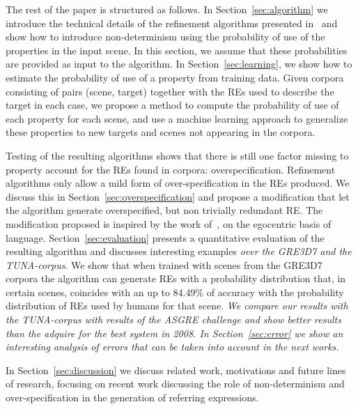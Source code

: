The rest of the paper is structured as follows. In Section~\ref{sec:algorithm} we introduce the technical details of the 
refinement algorithms presented in~\cite{arec2:2008:Areces,arec:usin11} and show how to introduce non-determinism using 
the probability of use of the properties in the input scene. In this section, we assume that these probabilities are provided as 
input to the algorithm. In Section~\ref{sec:learning}, we show how to estimate the 
probability of use of a property from training data. Given corpora consisting of pairs (scene, target) together with the REs used to 
describe the target in each case, we propose a method to compute the probability of use of each property for each scene, and use a machine learning approach to generalize these properties to new targets and scenes not appearing in the corpora. 

Testing of the resulting algorithms shows that there is still one factor missing to property account for the REs found in corpora: overspecification.  Refinement algorithms only allow a mild form of over-specification in the REs produced.  We discuss this in 
Section~\ref{sec:overspecification} and propose a modification that let the algorithm generate overspecified, but non trivially redundant RE.  The modification proposed is inspired by the work of~, on the egocentric basis of language.  
Section~\ref{sec:evaluation} presents a quantitative evaluation of the resulting algorithm and discusses interesting examples \textit{over the GRE3D7 and the TUNA-corpus}. 
We show that when trained with scenes from the GRE3D7 corpora the algorithm can generate REs with a probability distribution that, 
in certain scenes, coincides with an up to 84.49\% of accuracy with the probability distribution of REs used by humans for that scene. 
\textit{We compare our results with the TUNA-corpus with results of the ASGRE challenge and show better results than the adquire for the best system in 2008.
In Section~\ref{sec:error} we show an interesting analysis of errors that can be taken into account in the next works.}

In Section~\ref{sec:discussion} we discuss related work, motivations and future lines of research, focusing on recent work discussing the role 
of non-determinism and over-specification in the generation of referring expressions. 


